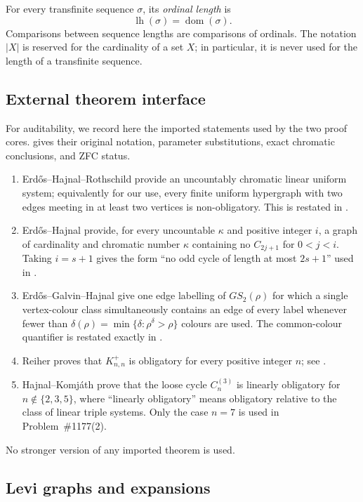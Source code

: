 \documentclass[11pt]{amsart}
\theoremstyle{definition}
\theoremstyle{remark}
\numberwithin{equation}{section}
\DeclareMathOperator{\dom}{dom}
\newcommand{\lh}{\operatorname{lh}}
\begin{document}
For every transfinite sequence $\sigma$, its \emph{ordinal length} is
\[
  \lh(\sigma)=\dom(\sigma).
\]
Comparisons between sequence lengths are comparisons of ordinals.  The
notation $|X|$ is reserved for the cardinality of a set $X$; in
particular, it is never used for the length of a transfinite sequence.

\subsection{External theorem interface}

For auditability, we record here the imported statements used by the two
proof cores.   gives their original notation,
parameter substitutions, exact chromatic conclusions, and ZFC status.
\begin{enumerate}[label=\textup{(E\arabic*)}]
\item Erd\H{o}s--Hajnal--Rothschild provide an uncountably chromatic
linear uniform system; equivalently for our use, every finite uniform
hypergraph with two edges meeting in at least two vertices is
non-obligatory.  This is restated in .
\item Erd\H{o}s--Hajnal provide, for every uncountable $\kappa$ and
positive integer $i$, a graph of cardinality and chromatic number
$\kappa$ containing no $C_{2j+1}$ for $0<j<i$.  Taking $i=s+1$ gives
the form ``no odd cycle of length at most $2s+1$'' used in
.
\item Erd\H{o}s--Galvin--Hajnal give one edge labelling of
$GS_2(\rho)$ for which a single vertex-colour class simultaneously
contains an edge of every label whenever fewer than
$\delta(\rho)=\min\{\delta:\rho^\delta>\rho\}$ colours are used.  The
common-colour quantifier is restated exactly in .
\item Reiher proves that $K_{n,n}^+$ is obligatory for every positive
integer $n$; see .
\item Hajnal--Komj\'ath prove that the loose cycle $C_n^{(3)}$ is
linearly obligatory for $n\notin\{2,3,5\}$, where ``linearly obligatory''
means obligatory relative to the class of linear triple systems.  Only the
case $n=7$ is used in Problem~\#1177(2).
\end{enumerate}
No stronger version of any imported theorem is used.

\subsection{Levi graphs and expansions}
\end{document}
